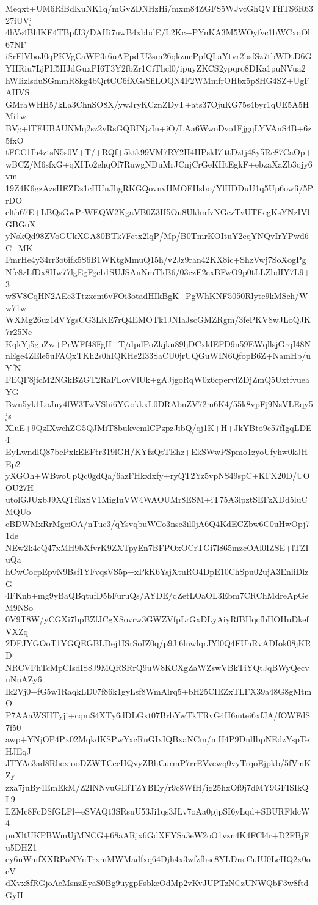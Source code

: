 Meqxt+UM6RfBdKuNK1q/mGvZDNHzHi/mxm84ZGFS5WJvcGhQVTfITS6R6327iUVj
4hVs4BhlKE4TBpfJ3/DAHi7uwB4xbbdE/L2Kc+PYnKA3M5WOyfvc1bWCxqOl67NF
iSrFlVboJ0qPKVgCaWP3r6uAPpdfU3sm26qkzucPpfQLaYtvr2bsfSz7tbWDtD6G
YHRiu7LjPIf5HJdGuxPI6T3Y2fbZr1CiThcl0/ipuyZKCS2ypqro8DKa1puNVua2
hWIizlsduSGmmR8kg4bQrtCC6fXGsSfiLOQN4F2WMmfrOHbx5p8HG4SZ+UgFAHVS
GMraWHH5/kLa3ChnSO8X/ywJryKCznZDyT+ats37OjuKG75s4byr1qUE5A5HMi1w
BVg+lTEUBAUNMq2sz2vRsGQBINjzIn+iO/LAa6WwoDvo1FjgqLYVAnS4B+6z5fxO
tFCC1Ih4ztsN5s0V+T/+RQf+5ktk99VM7RY2H4HPskI7lttDztj48y5Rc87CaOp+
wBCZ/M6sfxG+qXITo2ehqOf7RuwgNDuMrJCnjCrGeKHtEgkF+ebzaXaZb3qjy6vm
19Z4K6gzAzsHEZDs1cHUnJhgRKGQovnvHMOFHsbo/YlHDDuU1q5Up6owfi/5PrDO
clth67E+LBQsGwPrWEQW2KgaVB0Z3H5Ou8UkhnfvNGczTvUTEcgKsYNzIVlGBGoX
yNskQd98ZVoGUkXGA80BTk7Fctx2lqP/Mp/B0TmrKOItuY2eqYNQvIrYPwd6C+MK
FmrHe4y34rr3o6ifk5S6B1WKtgMmuQ15h/v2Jz9ran42KX8ic+ShzVwj7SoXogPg
Nfc8zLfDx8Hw77lgEgFgcb1SUJSAnNmTkB6/03czE2cxBFwO9p0tLLZbdIY7L9+3
wSV8CqHN2AEe3Ttzxcm6vFOi3otadHIkBgK+PgWhKNF5050Rlytc9kMSch/Ww71w
WXMg26uz1dVYgsCG3LKE7rQ4EMOTk1JNIaJscGMZRgm/3fePKV8wJLoQJK7r25Ne
KqkYj5guZw+PrWFf48FgH+T/dpdPoZkjkn89ljDCxldEFD9n59EWqllsjGrqI48N
nEge4ZEle5uFAQxTKh2s0hIQKHe2I33SaCU0jrUQGuWIN6QfopB6Z+NamHb/uYfN
FEQF8jicM2NGkBZGT2RaFLovVlUk+gAJjgoRqW0z6cpervlZDjZmQ5UxtfvueaYG
Bwn5yk1LoJny4fW3TwVShi6YGokkxL0DRAbnZV72m6K4/55k8vpFj9NsVLEqy5js
XluE+9QzIXwchZG5QJMiT8bukvemlCPzpzJibQ/qj1K+H+JkYBto9c57fIgqLDE4
EyLwndlQ87bcPxkEEFtr319lGH/KYfzQtTEhz+EkSWwPSpmo1zyoUfyhw0kJHEp2
yXGOh+WBwoUpQc0gdQa/6azFHkxlxfy+ryQT2Yz5vpNS49spC+KFX20D/UOOU27H
utolGJUxbJ9XQTf0xSV1MigIuVW4WAOUMr8ESM+iT75A3lpztSEFzXDd5luCMQUo
cBDWMxRrMgeiOA/nTuc3/qYsvqbuWCo3nsc3il0jA6Q4KdECZbw6C0uHwOpj71de
NEw2k4eQ47xMH9bXfvrK9ZXTpyEn7BFPOxOCrTGi7l865mzcOAl0IZSE+lTZIuQa
hCwCocpEpvN9Bsf1YFvqsVS5p+xPkK6YsjXtuRO4DpE10ChSpu02ujA3EnliDlzG
4FKnb+mg9yBaQBqtufD5bFuruQs/AYDE/qZetLOaOL3Ebm7CRChMdreApGeM9NSo
0V9T8W/yCGXi7bpBZfJCgXSovrw3GWZVfpLrGxDLyAiyRfBHqcfbHOHuDkefVXZq
2DFJYGOoT1YGQEGBLDej1ISrSoIZ0q/p9Ji6lnwlqrJYl0Q4FUhRvADIok08jKRD
NRCVFhTcMpCIsdIS8J9MQRSRrQ9uW8KCXgZaWZswVBkTiYQtJqBWyQecvuNnAZy6
Ik2Vj0+fG5w1RaqkLD07f86k1gyLsf8WmAlrq5+bH25CIEZxTLFX39a48G8gMtmO
P7AAaWSHTyji+cqmS4XTy6dDLGxt07BrbYwTkTRvG4H6mtei6xfJA/fOWFdS7f50
awp+YNjOP4Px02MqkdKSPwYxcRnGIxIQBxaNCm/mH4P9DnlIbpNEdzYspTeHJEqJ
JTYAe3ad8RhexiooDZWTCecHQvyZBhCurmP7rrEVvcwq0vyTrqoEjpkb/5fVmKZy
zxa7juBy4EmEkM/Z2INNvuGEfTZYBEy/r9c8WfH/ig25hxOf9j7dMY9GFISIkQL9
LZMc8FcDSfGLFl+eSVAQt3SRsuU53Ji1qs3JLv7oAa0pjpSI6yLqd+SBURFldcW4
pnXltUKPBWmUjMNCG+68aARjx6GdXFYSa3eW2oO1vzn4K4FCl4r+D2FBjFu5DHZ1
ey6uWmfXXRPoNYnTrxmMWMadfxq64Djh4x3wfzfhse8YLDrsiCuIU0LeHQ2x0ocV
dXvx8fRGjoAeMsnzEyaS0Bg9uygpFsbkeOdMp2vKvJUPTzNCzUNWQbF3w8ftdGyH
